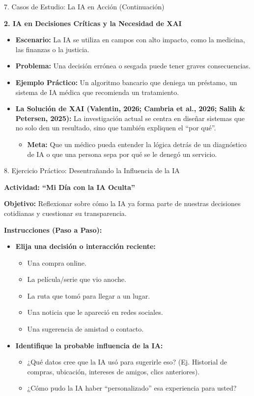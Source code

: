 \documentclass[aspectratio=169]{beamer}
\begin{document}
\begin{frame}[fragile]{7. Casos de Estudio: La IA en Acción (Continuación)}


\textbf{2. IA en Decisiones Críticas y la Necesidad de XAI}
\begin{itemize}
  \item \textbf{Escenario:} La IA se utiliza en campos con alto impacto, como la medicina, las finanzas o la justicia.
  \item \textbf{Problema:} Una decisión errónea o sesgada puede tener graves consecuencias.
  \item \textbf{Ejemplo Práctico:} Un algoritmo bancario que deniega un préstamo, un sistema de IA médica que recomienda un tratamiento.
  \item \textbf{La Solución de XAI (Valentin, 2026; Cambria et al., 2026; Salih \& Petersen, 2025):} La investigación actual se centra en diseñar sistemas que no solo den un resultado, sino que también expliquen el ``por qué''.
  \begin{itemize}
    \item \textbf{Meta:} Que un médico pueda entender la lógica detrás de un diagnóstico de IA o que una persona sepa por qué se le denegó un servicio.
  \end{itemize}
\end{itemize}
\end{frame}



\begin{frame}[fragile]{8. Ejercicio Práctico: Desentrañando la Influencia de la IA}


\textbf{Actividad: ``Mi Día con la IA Oculta''}

\textbf{Objetivo:} Reflexionar sobre cómo la IA ya forma parte de nuestras decisiones cotidianas y cuestionar su transparencia.

\textbf{Instrucciones (Paso a Paso):}
\begin{itemize}
  \item \textbf{Elija una decisión o interacción reciente:}
  \begin{itemize}
    \item Una compra online.
    \item La película/serie que vio anoche.
    \item La ruta que tomó para llegar a un lugar.
    \item Una noticia que le apareció en redes sociales.
    \item Una sugerencia de amistad o contacto.
  \end{itemize}
  \item \textbf{Identifique la probable influencia de la IA:}
  \begin{itemize}
    \item ¿Qué datos cree que la IA usó para sugerirle eso? (Ej. Historial de compras, ubicación, intereses de amigos, clics anteriores).
    \item ¿Cómo pudo la IA haber ``personalizado'' esa experiencia para usted?
  \end{itemize}
\end{itemize}
\end{frame}
\end{document}
